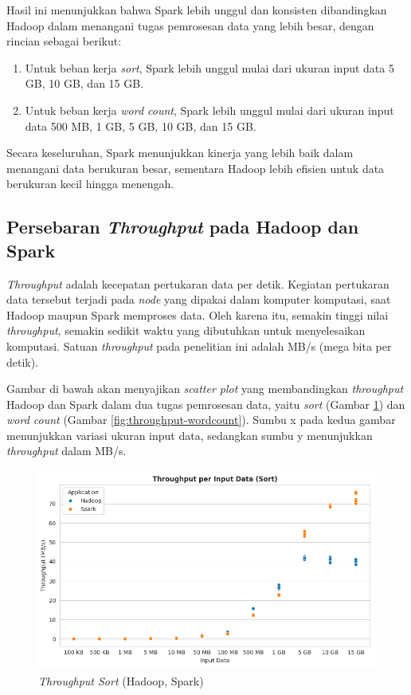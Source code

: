 Hasil ini menunjukkan bahwa Spark lebih unggul dan konsisten dibandingkan Hadoop dalam menangani tugas pemrosesan data yang lebih besar, dengan rincian sebagai berikut:
\begin{enumerate}
\item Untuk beban kerja \textit{sort}, Spark lebih unggul mulai dari ukuran input data 5 GB, 10 GB, dan 15 GB.
\item Untuk beban kerja \textit{word count}, Spark lebih unggul mulai dari ukuran input data 500 MB, 1 GB, 5 GB, 10 GB, dan 15 GB.
\end{enumerate}

Secara keseluruhan, Spark menunjukkan kinerja yang lebih baik dalam menangani data berukuran besar, sementara Hadoop lebih efisien untuk data berukuran kecil hingga menengah.

\subsection {Persebaran \textit{Throughput} pada Hadoop dan Spark}

\textit{Throughput} adalah kecepatan pertukaran data per detik. Kegiatan pertukaran data tersebut terjadi pada \textit{node} yang dipakai dalam komputer komputasi, saat Hadoop maupun Spark memproses data. Oleh karena itu, semakin tinggi nilai \textit{throughput}, semakin sedikit waktu yang dibutuhkan untuk menyelesaikan komputasi. Satuan \textit{throughput} pada penelitian ini adalah MB/s (mega bita per detik).

Gambar di bawah akan menyajikan \textit{scatter plot} yang membandingkan \textit{throughput} Hadoop dan Spark dalam dua tugas pemrosesan data, yaitu \textit{sort} (Gambar \ref{fig:throughput-sort}) dan \textit{word count} (Gambar \ref{fig:throughput-wordcount}). Sumbu x pada kedua gambar menunjukkan variasi ukuran input data, sedangkan sumbu y menunjukkan \textit{throughput} dalam MB/s.

\begin{figure}[h]
    \centering
    \includegraphics[width=1\textwidth]{figures/ch04/1-throughput-sort.png}
    \caption{\textit{Throughput Sort} (Hadoop, Spark)}
    \label{fig:throughput-sort}
\end{figure}

